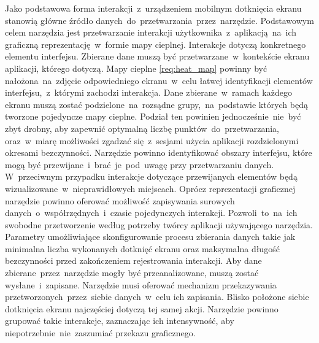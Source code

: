 \begin{enumerate}[label=\textbf{F.\arabic*}]
	 Jako podstawowa forma interakcji~z~urządzeniem mobilnym dotknięcia ekranu stanowią główne źródło danych~do~przetwarzania~przez~narzędzie.
	 Podstawowym celem narzędzia jest przetwarzanie interakcji użytkownika~z~aplikacją~na~ich graficzną reprezentację~w~formie mapy cieplnej. 
	 Interakcje dotyczą konkretnego elementu interfejsu. Zbierane dane muszą być przetwarzane~w~kontekście ekranu aplikacji, którego dotyczą. Mapy cieplne \ref{req:heat_map} powinny być nałożona~na~zdjęcie odpowiedniego ekranu~w~celu łatwej identyfikacji elementów interfejsu,~z~którymi zachodzi interakcja.
	 Dane zbierane~w~ramach każdego ekranu muszą zostać podzielone~na~rozsądne grupy,~na~podstawie których będą tworzone pojedyncze mapy cieplne. Podział ten powinien jednocześnie~nie~być zbyt drobny, aby zapewnić optymalną liczbę punktów~do~przetwarzania, oraz~w~miarę możliwości zgadzać się~z~sesjami użycia aplikacji rozdzielonymi okresami bezczynności.
	 Narzędzie powinno identyfikować obszary interfejsu, które mogą być przewijane~i~brać~je~pod~uwagę przy przetwarzaniu danych. W~przeciwnym przypadku interakcje dotyczące przewijanych elementów będą wizualizowane~w~nieprawidłowych miejscach.
	 Oprócz reprezentacji graficznej narzędzie powinno oferować możliwość zapisywania surowych danych~o~współrzędnych~i~czasie pojedynczych interakcji. Pozwoli~to~na~ich swobodne przetworzenie według potrzeby twórcy aplikacji używającego narzędzia.
	 Parametry umożliwiające skonfigurowanie procesu zbierania danych takie jak minimalna liczba wykonanych dotknięć ekranu oraz maksymalna długość bezczynności przed zakończeniem rejestrowania interakcji.
	 Aby dane zbierane~przez~narzędzie mogły być przeanalizowane, muszą zostać wysłane~i~zapisane. Narzędzie musi oferować mechanizm przekazywania przetworzonych~przez~siebie danych~w~celu ich zapisania.
	 Blisko położone siebie dotknięcia ekranu najczęściej dotyczą tej samej akcji. Narzędzie powinno grupować takie interakcje, zaznaczając ich intensywność, aby niepotrzebnie~nie~zaszumiać przekazu graficznego.

\end{enumerate}
